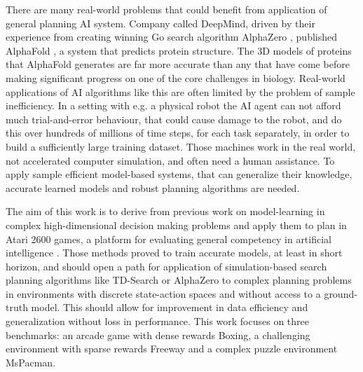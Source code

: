 There are many real-world problems that could benefit from application of general planning AI system. Company called DeepMind, driven by their experience from creating winning Go search algorithm AlphaZero \cite{Algo.AlphaZero}, published AlphaFold \cite{Algo.AlphaFold}, a system that predicts protein structure. The 3D models of proteins that AlphaFold generates are far more accurate than any that have come before making significant progress on one of the core challenges in biology. Real-world applications of AI algorithms like this are often limited by the problem of sample inefficiency. In a setting with e.g. a physical robot the AI agent can not afford much trial-and-error behaviour, that could cause damage to the robot, and do this over hundreds of millions of time steps, for each task separately, in order to build a sufficiently large training dataset. Those machines work in the real world, not accelerated computer simulation, and often need a human assistance. To apply sample efficient model-based systems, that can generalize their knowledge, accurate learned models and robust planning algorithms are needed.

The aim of this work is to derive from previous work on model-learning in complex high-dimensional decision making problems \cite{Algo.RecurrentEnvSim}\cite{Algo.JointFrameRewardPrediction}\cite{Algo.FastGenerativeModels}\cite{Algo.PlaNet} and apply them to plan in Atari 2600 games, a platform for evaluating general competency in artificial intelligence \cite{Benchmark.RevisitingALE}. Those methods proved to train accurate models, at least in short horizon, and should open a path for application of simulation-based search planning algorithms like TD-Search \cite{Algo.TDSearch} or AlphaZero \cite{Algo.AlphaZero} to complex planning problems in environments with discrete state-action spaces and without access to a ground-truth model. This should allow for improvement in data efficiency and generalization  without loss in performance. This work focuses on three benchmarks: an arcade game with dense rewards Boxing, a challenging environment with sparse rewards Freeway and a complex puzzle environment MsPacman.

